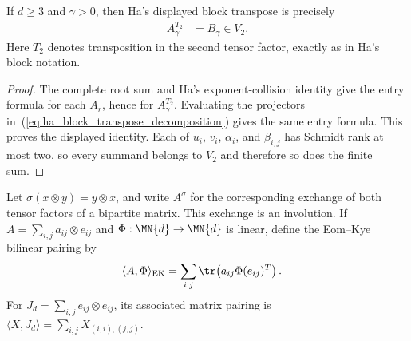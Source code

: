 \begin{theorem}
    \label{thm:ha_block_transpose_two_simple}
    \leanok
    If $d\ge3$ and $\gamma>0$, then Ha's displayed block transpose is
    precisely
    \begin{align}
        A_\gamma^{T_2}
         & =B_\gamma\in V_2.
        \label{eq:ha_block_transpose_two_simple}
    \end{align}
    Here $T_2$ denotes transposition in the second tensor factor, exactly as
    in Ha's block notation.
\end{theorem}

\begin{proof}
    \leanok
    The complete root sum and Ha's exponent-collision identity give the
    entry formula for each $A_r$, hence for $A_\gamma^{T_2}$. Evaluating the
    projectors in~(\ref{eq:ha_block_transpose_decomposition}) gives the same
    entry formula. This proves the displayed identity. Each of $u_i$, $v_i$,
    $\alpha_i$, and $\beta_{i,j}$ has Schmidt rank at most two, so every
    summand belongs to $V_2$ and therefore so does the finite sum.
\end{proof}

\begin{definition}
    \label{def:ha_eom_kye_pairing}
    \leanok
    Let $\sigma(x\otimes y)=y\otimes x$, and write $A^\sigma$ for the
    corresponding exchange of both tensor factors of a bipartite matrix.
    This exchange is an involution. If
    $A=\sum_{i,j}a_{ij}\otimes e_{ij}$ and
    $\Phi:\MN{d}\to\MN{d}$ is linear, define the Eom--Kye bilinear pairing by
    \begin{align}
        \langle A,\Phi\rangle_{\mathrm{EK}}
         & =\sum_{i,j}\tr\!\left(a_{ij}\Phi(e_{ij})^T\right).
        \label{eq:ha_eom_kye_pairing}
    \end{align}
    For $J_d=\sum_{i,j}e_{ij}\otimes e_{ij}$, its associated matrix pairing
    is
    $\langle X,J_d\rangle=\sum_{i,j}X_{(i,i),(j,j)}$.
\end{definition}

